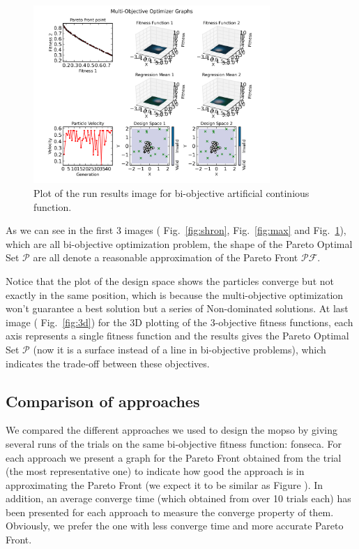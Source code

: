 \documentclass[11pt, runningheads,a4paper]{llncs}
\begin{document}
\begin{figure}
        \centering
    \centering
\includegraphics[width=0.8\textwidth]{./figs/fosna.png}
        \caption{Plot of the run results image for bi-objective artificial continious function.}\label{fig:fonseca}
\end{figure}

As we can see in the first 3 images ( Fig.~\ref{fig:shron}, Fig.~\ref{fig:max} and Fig.~\ref{fig:fonseca}), which are all bi-objective optimization problem, the shape of the Pareto Optimal Set  $\mathcal{P}$ are all denote a reasonable approximation of the Pareto Front $\mathcal{PF}$. 

Notice that the plot of the design space shows the particles converge but not exactly in the same position, which is because the multi-objective optimization won't guarantee a best solution but a series of Non-dominated solutions. At last image ( Fig.~\ref{fig:3d}) for the 3D plotting of the 3-objective fitness functions, each axis represents a single fitness function and the results gives the  Pareto Optimal Set  $\mathcal{P}$ (now it is a surface instead of a line in bi-objective problems), which indicates the trade-off between these objectives.



\subsection{Comparison of approaches}
We compared the different approaches we used to design the \ac{mopso} by giving several runs of the trials on the same bi-objective fitness function: fonseca. For each approach we present a graph for the Pareto Front obtained from the trial (the most representative one) to indicate how good the approach is in approximating the Pareto Front (we expect it to be similar as Figure ). In addition, an average converge time (which obtained from over 10 trials each) has been presented for each approach to measure the converge property of them. Obviously, we prefer the one with less converge time and more accurate Pareto Front.
\end{document}

